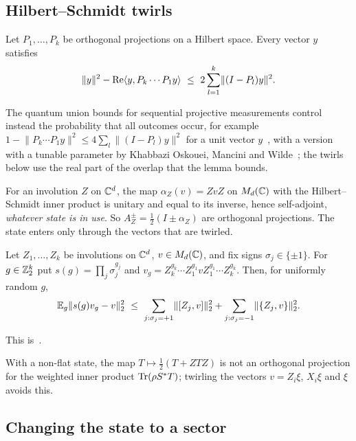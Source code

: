 \subsection{Hilbert--Schmidt twirls}\label{sec:prelim-twirl}

\begin{lemma}\label{lem:projection-product}
Let $P_1,\dots,P_k$ be orthogonal projections on a Hilbert space. Every vector $y$ satisfies
\[
\lVert y\rVert^2-\operatorname{Re}\langle y,P_k\cdots P_1y\rangle\ \le\ 2\sum_{l=1}^k\lVert(I-P_l)y\rVert^2 .
\]
\end{lemma}

The quantum union bounds for sequential projective measurements control instead the probability that all outcomes occur, for
example $1-\lVert P_k\cdots P_1y\rVert^2\le4\sum_l\lVert(I-P_l)y\rVert^2$ for a unit vector $y$~\cite[Theorem~1]{Gao15}, with a version
with a tunable parameter by Khabbazi Oskouei, Mancini and Wilde~\cite{KMW19}; the twirls below use the real part of the overlap that the
lemma bounds.

For an involution $Z$ on $\mathbb C^d$, the map $\alpha_Z(v)=ZvZ$ on $M_d(\mathbb C)$ with the Hilbert--Schmidt inner product is
unitary and equal to its inverse, hence self-adjoint, \emph{whatever state is in use}. So $A_Z^\pm=\frac12(I\pm\alpha_Z)$
are orthogonal projections. The state enters only through the vectors that are twirled.

\begin{lemma}\label{lem:twirl}
Let $Z_1,\dots,Z_k$ be involutions on $\mathbb C^d$, $v\in M_d(\mathbb C)$, and fix signs $\sigma_j\in\{\pm1\}$. For
$g\in\mathbb Z_2^k$ put $s(g)=\prod_j\sigma_j^{g_j}$ and $v_g=Z_k^{g_k}\cdots Z_1^{g_1}vZ_1^{g_1}\cdots Z_k^{g_k}$. Then, for
uniformly random $g$,
\[
\mathbb E_g\hs{s(g)v_g-v}^2\ \le\ \sum_{j:\sigma_j=+1}\hs{[Z_j,v]}^2+\sum_{j:\sigma_j=-1}\hs{\{Z_j,v\}}^2 .
\]
\end{lemma}

This is~\cite[Lemma~3.9]{DM-game}.

With a non-flat state, the map $T\mapsto\frac12(T+ZTZ)$ is not an orthogonal projection for the weighted inner product
$\operatorname{Tr}(\rho S^*T)$; twirling the vectors $v=Z_i\xi$, $X_i\xi$ and $\xi$ avoids this.

\subsection{Changing the state to a sector}\label{sec:prelim-sector}

